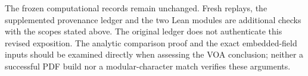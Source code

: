 \documentclass[11pt,a4paper]{article}
\theoremstyle{definition}
\begin{document}
The frozen computational records remain unchanged. Fresh replays,
the supplemented provenance ledger and the two Lean modules are
additional checks with the scopes stated above. The original ledger
does not authenticate this revised exposition. The analytic comparison
proof and the exact embedded-field inputs should be examined directly
when assessing the VOA conclusion; neither a successful PDF build nor
a modular-character match verifies these arguments.

\end{document}
